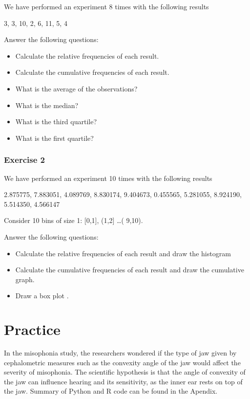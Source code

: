\documentclass[
]{book}
\providecommand{\tightlist}{%
  \setlength{\itemsep}{0pt}\setlength{\parskip}{0pt}}
\begin{document}
We have performed an experiment 8 times with the following results

3, 3, 10, 2, 6, 11, 5, 4

Answer the following questions:

\begin{itemize}
\tightlist
\item
  Calculate the relative frequencies of each result.
\item
  Calculate the cumulative frequencies of each result.
\item
  What is the average of the observations?
\item
  What is the median?
\item
  What is the third quartile?
\item
  What is the first quartile?
\end{itemize}

\hypertarget{exercise-2}{%
\subsubsection{Exercise 2}\label{exercise-2}}

We have performed an experiment 10 times with the following results

2.875775, 7.883051, 4.089769, 8.830174, 9.404673, 0.455565, 5.281055, 8.924190, 5.514350, 4.566147

Consider 10 bins of size 1: {[}0,1{]}, (1,2{]} \ldots( 9,10).

Answer the following questions:

\begin{itemize}
\item
  Calculate the relative frequencies of each result and draw the histogram
\item
  Calculate the cumulative frequencies of each result and draw the cumulative graph.
\item
  Draw a box plot .
\end{itemize}

\hypertarget{practice}{%
\section{Practice}\label{practice}}

In the misophonia study, the researchers wondered if the type of jaw given by cephalometric measures such as the convexity angle of the jaw would affect the severity of misophonia. The scientific hypothesis is that the angle of convexity of the jaw can influence hearing and its sensitivity, as the inner ear rests on top of the jaw. Summary of Python and R code can be found in the Apendix.
\end{document}
